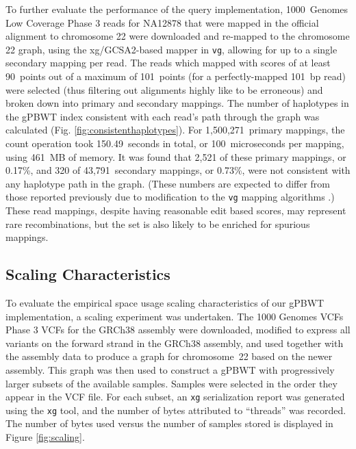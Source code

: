 To further evaluate the performance of the query implementation, 1000~Genomes Low Coverage Phase 3 reads for NA12878 that were mapped in the official alignment to chromosome 22 were downloaded and re-mapped to the chromosome 22 graph, using the xg/GCSA2-based mapper in \texttt{vg}, allowing for up to a single secondary mapping per read. The reads which mapped with scores of at least 90~points out of a maximum of 101~points (for a perfectly-mapped 101~bp read) were selected (thus filtering out alignments highly like to be erroneous) and broken down into primary and secondary mappings. The number of haplotypes in the gPBWT index consistent with each read's path through the graph was calculated (Fig. \ref{fig:consistenthaplotypes}). For 1,500,271~primary mappings, the count operation took 150.49~seconds in total, or 100~microseconds per mapping, using 461~MB of memory. It was found that 2,521 of these primary mappings, or 0.17\%, and 320 of 43,791~secondary mappings, or 0.73\%, were not consistent with any haplotype path in the graph. (These numbers are expected to differ from those reported previously due to modification to the \texttt{vg} mapping algorithms  \cite{novak2016graph}.) These read mappings, despite having reasonable edit based scores, may represent rare recombinations, but the set is also likely to be enriched for spurious mappings.




\subsection{Scaling Characteristics}

To evaluate the empirical space usage scaling characteristics of our gPBWT implementation, a scaling experiment was undertaken. The 1000 Genomes VCFs Phase 3 VCFs for the GRCh38 assembly were downloaded, modified to express all variants on the forward strand in the GRCh38 assembly, and used together with the assembly data to produce a graph for chromosome~22 based on the newer assembly. This graph was then used to construct a gPBWT with progressively larger subsets of the available samples. Samples were selected in the order they appear in the VCF file. For each subset, an \texttt{xg} serialization report was generated using the \texttt{xg} tool, and the number of bytes attributed to ``threads'' was recorded. The number of bytes used versus the number of samples stored is displayed in Figure \ref{fig:scaling}.

